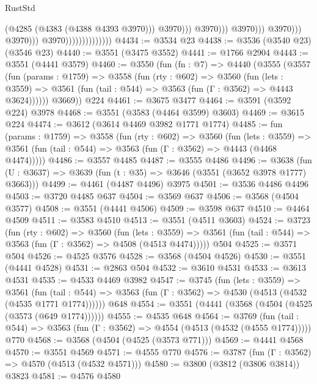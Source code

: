 \begin{lexlean}{RustStd}
\begin{coremodule}
                                                              (@4285 (@4383 (@4388 @4393 @3970)))
                                                              @3970)))
                                                        @3970)))
                                                  @3970)))
                                            @3970)))
                                      @3970)))
                                @3970))))))))))))))
@4434 := @3534 @23
@4438 := @3536 (@3540 @23) (@3546 @23)
@4440 := @3551 (@3475 @3552)
@4441 := @1766 @2904
@4443 := @3551 (@4441 @3579)
@4460 := @3550
    (fun (fn : @7) =>
    @4440
      (@3555
        (@3557
          (fun (params : @1759) =>
          @3558
            (fun (rty : @602) =>
            @3560
              (fun (lets : @3559) =>
              @3561 (fun (tail : @544) => @3563 (fun (Γ : @3562) => @4443 @3624))))))
        @3669))
    @224
@4461 := @3675 @3477
@4464 := @3591 (@3592 @224) @3978
@4468 := @3551 (@3583 (@4464 @3599) @3603)
@4469 := @3615 @224
@4474 := @3612 (@3614 @4469 @3982 @1771 @1774)
@4485 := fun (params : @1759) =>
  @3558
    (fun (rty : @602) =>
    @3560
      (fun (lets : @3559) =>
      @3561 (fun (tail : @544) => @3563 (fun (Γ : @3562) => @4443 (@4468 @4474)))))
@4486 := @3557 @4485
@4487 := @3555 @4486
@4496 := @3638 (fun (U : @3637) => @3639 (fun (t : @35) => @3646 (@3551 (@3652 @3978 @1777) @3663)))
@4499 := @4461 (@4487 @4496) @3975
@4501 := @3536 @4486 @4496
@4503 := @3720 @4485 @637
@4504 := @3569 @637
@4506 := @3568 (@4504 @3577)
@4508 := @3551 (@4441 @4506)
@4509 := @3598 @637
@4510 := @4464 @4509
@4511 := @3583 @4510
@4513 := @3551 (@4511 @3603)
@4524 := @3723
    (fun (rty : @602) =>
    @3560
      (fun (lets : @3559) =>
      @3561 (fun (tail : @544) => @3563 (fun (Γ : @3562) => @4508 (@4513 @4474)))))
    @504
@4525 := @3571 @504
@4526 := @4525 @3576
@4528 := @3568 (@4504 @4526)
@4530 := @3551 (@4441 @4528)
@4531 := @2863 @504
@4532 := @3610 @4531
@4533 := @3613 @4531
@4535 := @4533 @4469 @3982
@4547 := @3745
    (fun (lets : @3559) =>
    @3561
      (fun (tail : @544) => @3563 (fun (Γ : @3562) => @4530 (@4513 (@4532 (@4535 @1771 @1774))))))
    @648
@4554 := @3551 (@4441 (@3568 (@4504 (@4525 (@3573 (@649 @1774))))))
@4555 := @4535 @648
@4564 := @3769
    (fun (tail : @544) => @3563 (fun (Γ : @3562) => @4554 (@4513 (@4532 (@4555 @1774)))))
    @770
@4568 := @3568 (@4504 (@4525 (@3573 @771)))
@4569 := @4441 @4568
@4570 := @3551 @4569
@4571 := @4555 @770
@4576 := @3787 (fun (Γ : @3562) => @4570 (@4513 (@4532 @4571)))
@4580 := @3800 (@3812 (@3806 @3814)) @3823
@4581 := @4576 @4580

\end{coremodule}
\end{lexlean}
